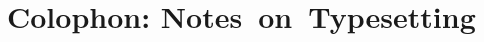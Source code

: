 %
%
%
%
%
%
%
%
%
%
%

\section{Colophon: Notes~on~Typesetting} \label{typesetting}

\vspace{-5.5bp}

